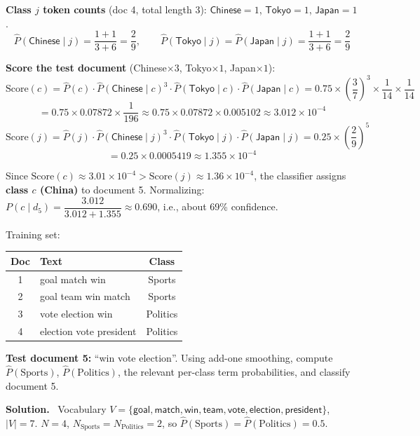 \documentclass[11pt, a4paper]{article}
\newcommand{\Solution}{\medskip\noindent\textbf{\color{exgreen}Solution.}\ }
\begin{document}
\begin{examplebox}
\textbf{Class $j$ token counts} (doc 4, total length $3$): $\textsf{Chinese}=1$, $\textsf{Tokyo}=1$, $\textsf{Japan}=1$.
\[
\hat P(\textsf{Chinese}\mid j) = \frac{1+1}{3+6}=\frac29, \qquad
\hat P(\textsf{Tokyo}\mid j) = \hat P(\textsf{Japan}\mid j) = \frac{1+1}{3+6}=\frac29
\]

\textbf{Score the test document} (Chinese$\times3$, Tokyo$\times1$, Japan$\times1$):
\[
\text{Score}(c) = \hat P(c)\cdot\hat P(\textsf{Chinese}\mid c)^3\cdot \hat P(\textsf{Tokyo}\mid c)\cdot\hat P(\textsf{Japan}\mid c) = 0.75\times\left(\frac37\right)^3\times\frac1{14}\times\frac1{14}
\]
\[
= 0.75\times0.07872\times\frac1{196} \approx 0.75\times0.07872\times0.005102 \approx 3.012\times10^{-4}
\]
\[
\text{Score}(j) = \hat P(j)\cdot\hat P(\textsf{Chinese}\mid j)^3\cdot \hat P(\textsf{Tokyo}\mid j)\cdot\hat P(\textsf{Japan}\mid j) = 0.25\times\left(\frac29\right)^5
\]
\[
= 0.25\times0.0005419 \approx 1.355\times10^{-4}
\]

Since $\text{Score}(c) \approx 3.01\times10^{-4} > \text{Score}(j)\approx1.36\times10^{-4}$, the classifier assigns \textbf{class $c$ (China)} to document 5. Normalizing: $P(c\mid d_5) = \dfrac{3.012}{3.012+1.355}\approx0.690$, i.e., about 69\% confidence.
\end{examplebox}

\begin{exercisebox}
Training set:
\begin{center}
\begin{tabular}{@{}clc@{}}
\toprule
Doc & Text & Class \\
\midrule
1 & goal match win & Sports \\
2 & goal team win match & Sports \\
3 & vote election win & Politics \\
4 & election vote president & Politics \\
\bottomrule
\end{tabular}
\end{center}
\textbf{Test document 5:} ``win vote election''. Using add-one smoothing, compute $\hat P(\text{Sports})$, $\hat P(\text{Politics})$, the relevant per-class term probabilities, and classify document 5.
\end{exercisebox}

\Solution
Vocabulary $V=\{\textsf{goal},\textsf{match},\textsf{win},\textsf{team},\textsf{vote},\textsf{election},\textsf{president}\}$, $|V|=7$. $N=4$, $N_{\text{Sports}}=N_{\text{Politics}}=2$, so $\hat P(\text{Sports})=\hat P(\text{Politics})=0.5$.
\end{document}
